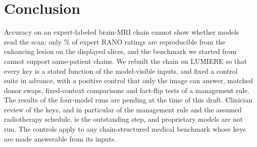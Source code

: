 \section{Conclusion}
\label{sec:conclusion}

Accuracy on an expert-labeled brain-MRI chain cannot show whether models read the scan: only \vfourConcordantPct{}\% of expert RANO ratings are reproducible from the enhancing lesion on the displayed slices, and the benchmark we started from cannot support same-patient chains. We rebuilt the chain on LUMIERE so that every key is a stated function of the model-visible inputs, and fixed a control suite in advance, with a positive control that only the image can answer, matched donor swaps, fixed-context comparisons and fact-flip tests of a management rule. \ifnum{} The results of the four-model runs are pending at the time of this draft. \fi Clinician review of the keys, and in particular of the management rule and the assumed radiotherapy schedule, is the outstanding step, and proprietary models are not run. The controls apply to any chain-structured medical benchmark whose keys are made answerable from its inputs.

